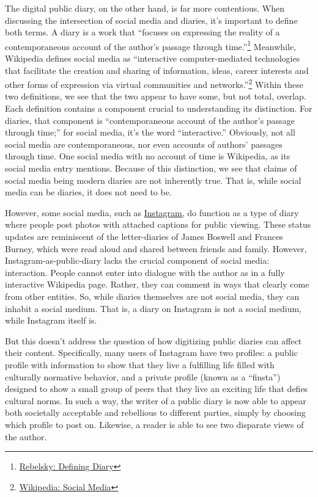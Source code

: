 \documentclass[12pt]{article}[titlepage]
\newcommand{\say}[1]{``#1''}
\newcommand{\1}{\={a}}
\newcommand{\2}{\={e}}
\newcommand{\3}{\={\i}}
\newcommand{\4}{\=o}
\newcommand{\5}{\=u}
\newcommand{\6}{\={A}}
\renewcommand{\,}{\textsuperscript{,}}
\begin{document}
The digital public diary, on the other hand, is far more contentious.
When discussing the intersection of social media and diaries, it's important to define both terms.
A diary is a work that \say{focuses on expressing the reality of a contemporaneous account of the author's passage through time.}\footnote{\href{defining-diary.html}{Rebelsky: Defining Diary}}
Meanwhile, Wikipedia defines social media as \say{interactive computer-mediated technologies that facilitate the creation and sharing of information, ideas, career interests and other forms of expression via virtual communities and networks.}\footnote{\href{https://en.wikipedia.org/wiki/Social_media}{Wikipedia: Social Media}}
Within these two definitions, we see that the two appear to have some, but not total, overlap.
Each definition contains a component crucial to understanding its distinction.
For diaries, that component is \say{contemporaneous account of the author's passage through time;} for social media, it's the word \say{interactive.}
Obviously, not all social media are contemporaneous, nor even accounts of authors' passages through time.
One social media with no account of time is Wikipedia, as its social media entry mentions.
Because of this distinction, we see that claims of social media being modern diaries are not inherently true.
That is, while social media can be diaries, it does not need to be.

However, some social media, such as \href{instagram.com}{Instagram,} do function as a type of diary where people post photos with attached captions for public viewing.
These status updates are reminiscent of the letter-diaries of James Boswell and Frances Burney, which were read aloud and shared between friends and family.
However, Instagram-as-public-diary lacks the crucial component of social media: interaction.
People cannot enter into dialogue with the author as in a fully interactive Wikipedia page.
Rather, they can comment in ways that clearly come from other entities. 
So, while diaries themselves are not social media, they can inhabit a social medium.
That is, a diary on Instagram is not a social medium, while Instagram itself is.

But this doesn't address the question of how digitizing public diaries can affect their content.
Specifically, many users of Instagram have two profiles: a public profile with information to show that they live a fulfilling life filled with culturally normative behavior, and a private profile (known as a \say{finsta}) designed to show a small group of peers that they live an exciting life that defies cultural norms.
In such a way, the writer of a public diary is now able to appear both societally acceptable and rebellious to different parties, simply by choosing which profile to post on.
Likewise, a reader is able to see two disparate views of the author.
\end{document}
